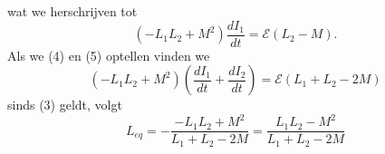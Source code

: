 \begin{description}[labelwidth=1.5cm, leftmargin=!]
\begin{description}[labelwidth=1.5cm, leftmargin=!]
                wat we herschrijven tot
                \begin{equation}
                    (-L_1L_2 + M^2)\frac{dI_1}{dt} = \mathcal{E}(L_2 - M). \tag{5}
                \end{equation}
                Als we (4) en (5) optellen vinden we
                \begin{equation*}
                    (-L_1L_2 + M^2)\left(\frac{dI_1}{dt} + \frac{dI_2}{dt}\right) = \mathcal{E}(L_1 + L_2 - 2M)
                \end{equation*}
                sinds (3) geldt, volgt
                \begin{equation*}
                    L_{eq} = - \frac{-L_1L_2 + M^2}{L_1 + L_2 - 2M} = \frac{L_1L_2 - M^2}{L_1 + L_2 - 2M}
                \end{equation*}
        \end{description}
\end{description}

\vspace{1cm}